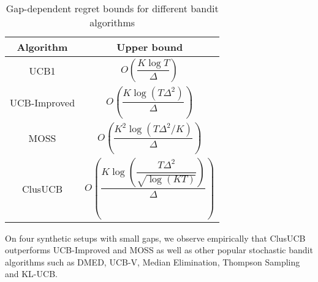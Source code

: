 

\begin{table}
\caption{Gap-dependent regret bounds for different bandit algorithms}
\label{tab:regret-bds}
\begin{center}
\begin{tabular}{|c|c|}
\toprule
Algorithm  & Upper bound \\
\midrule
UCB1         &$O\left(\dfrac{K\log T}{\Delta}\right)$ \\\midrule
UCB-Improved &$O\left(\dfrac{K\log (T\Delta^{2})}{\Delta}\right)$ \\\midrule
MOSS	     &$O\left(\dfrac{K^{2}\log\left(T\Delta^{2}/K\right)}{\Delta}\right)$\\\midrule
ClusUCB      &$O\left(\dfrac{K\log\left(\dfrac{T\Delta^{2}}{\sqrt{\log (KT)}}\right)}{\Delta}\right)$\\\bottomrule
\end{tabular}
\end{center}
\end{table}


On four synthetic setups with small gaps, we observe empirically that ClusUCB outperforms UCB-Improved\cite{auer2010ucb} and MOSS\cite{audibert2009minimax} as well as other popular stochastic bandit algorithms such as DMED\cite{honda2010asymptotically}, UCB-V\cite{audibert2009exploration}, Median Elimination\cite{even2006action}, Thompson Sampling\cite{agrawal2011analysis} and KL-UCB\cite{garivier2011kl}.

